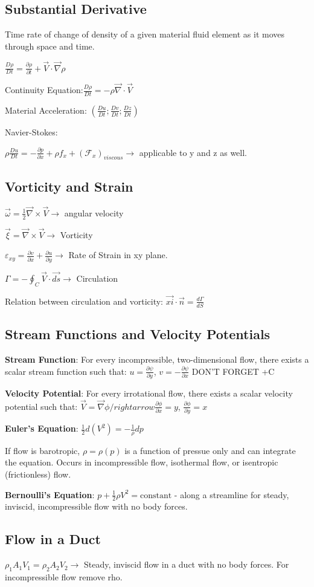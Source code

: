 \documentclass{article}
\begin{document}
\begin{multicols*}{3}
\subsection*{Substantial Derivative}
Time rate of change of density of a given material fluid element as it moves through space and time.\par 
$\frac{D\rho}{Dt}=\frac{\partial\rho}{\partial t}+\vec{V}\cdot\vec{\nabla}\rho$\par 
Continuity Equation:$\frac{D\rho}{Dt}=-\rho\vec{\nabla}\cdot\vec{V}$\par 
Material Acceleration: $(\frac{Du}{Dt};\frac{Dv}{Dt};\frac{Dz}{Dt})$\par 
Navier-Stokes:\par 
$\rho\frac{Du}{Dt}=-\frac{\partial p}{\partial x}+\rho f_x+(\mathcal{F}_x)_{viscous}\rightarrow$ applicable to y and z as well.\par 

\subsection*{Vorticity and Strain}
$\vec{\omega}=\frac{1}{2}\vec{\nabla}\times\vec{V}\rightarrow$ angular velocity\par 
$\vec{\xi}=\vec{\nabla}\times\vec{V}\rightarrow$ Vorticity\par 
$\varepsilon_{xy}=\frac{\partial v}{\partial x}+\frac{\partial u}{\partial y}\rightarrow$ Rate of Strain in xy plane.\par
$\Gamma=-\oint_C\vec{V}\cdot\vec{ds}\rightarrow$ Circulation\par 
Relation between circulation and vorticity: $\vec{xi}\cdot\vec{n}=\frac{d\Gamma}{dS}$

\subsection*{Stream Functions and Velocity Potentials}
\textbf{Stream Function}: For every incompressible, two-dimensional flow, there exists a scalar stream function such that: $u=\frac{\partial\psi}{\partial y}$, $v=-\frac{\partial\psi}{\partial x}$ DON'T FORGET +C\par 
\textbf{Velocity Potential}: For every irrotational flow, there exists a scalar velocity potential such that: $\vec{V}=\vec{\nabla}\phi/rightarrow \frac{\partial\phi}{\partial x}=y$, $\frac{\partial\phi}{\partial y}=x$\par 
\textbf{Euler's Equation}: $\frac{1}{2}d(V^2)=-\frac{1}{\rho}dp$\par 
If flow is barotropic, $\rho=\rho(p)$ is a function of pressue only and can integrate the equation. Occurs in incompressible flow, isothermal flow, or isentropic (frictionless) flow.\par 
\textbf{Bernoulli's Equation}: $p+\frac{1}{2}\rho V^2=\text{constant}$ - along a streamline for steady, inviscid, incompressible flow with no body forces.

\subsection*{Flow in a Duct}
$\rho_1A_1V_1=\rho_2A_2V_2\rightarrow$ Steady, inviscid flow in a duct with no body forces. For incompressible flow remove rho.



\end{multicols*}
\end{document}
